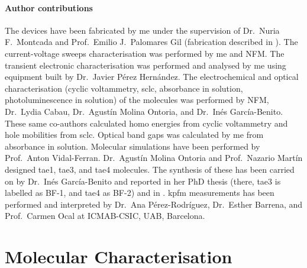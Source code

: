 	\paragraph{Author contributions}
	The devices have been fabricated by me under the supervision of Dr.\ Nuria F.\ Montcada and Prof.\ Emilio J.\ Palomares Gil (fabrication described in ).
	The current\hyp{}voltage sweeps characterisation was performed by me and NFM.
	The transient electronic characterisation was performed and analysed by me using equipment built by Dr.\ Javier Pérez Hernández.
	The electrochemical and optical characterisation (cyclic voltammetry, \gls{sclc}, absorbance in solution, photoluminescence in solution) of the molecules was performed by NFM, Dr.\ Lydia Cabau, Dr.\ Agustín Molina Ontoria, and Dr.\ Inés García\hyp{}Benito.
	These same co-authors calculated \gls{homo} energies from cyclic voltammetry and hole mobilities from \gls{sclc}.
	Optical band gaps was calculated by me from absorbance in solution.
	Molecular simulations have been performed by Prof.\ Anton Vidal\hyp{}Ferran.
	Dr.\ Agustín Molina Ontoria and Prof.\ Nazario Martín designed \gls{tae1}, \gls{tae3}, and \gls{tae4} molecules.
	The synthesis of these has been carried on by Dr.\ Inés García\hyp{}Benito and reported in her PhD thesis \cite{Garcia-Benito2017} (there, \gls{tae3} is labelled as BF-1, and \gls{tae4} as BF-2) and in \cite{Gelmetti2019}.
	\Gls{kpfm} measurements has been performed and interpreted by Dr.\ Ana Pérez-Rodríguez, Dr.\ Esther Barrena, and Prof.\ Carmen Ocal at ICMAB-CSIC, UAB, Barcelona.



\section{Molecular Characterisation}

